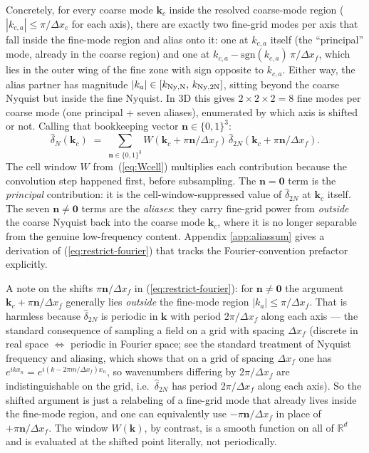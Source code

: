 \documentclass[12pt]{article}
\begin{document}
Concretely, for every coarse mode $\mathbf k_c$ inside the resolved
coarse-mode region ($|k_{c,a}|\le\pi/\Delta x_c$ for each axis), there
are exactly two fine-grid modes per axis that fall inside the fine-mode
region and alias onto it: one at $k_{c,a}$ itself (the ``principal''
mode, already in the coarse region) and one at
$k_{c,a}-\mathrm{sgn}(k_{c,a})\,\pi/\Delta x_f$, which lies in the
outer wing of the fine zone with sign opposite to $k_{c,a}$. Either way, the alias partner has magnitude
$|k_a|\in[k_{\rm Ny,N},\,k_{\rm Ny,2N}]$, sitting beyond the coarse
Nyquist but inside the fine Nyquist. In 3D this gives $2\times 2\times 2 = 8$
fine modes per coarse mode (one principal + seven aliases),
enumerated by which axis is shifted or not.
Calling that bookkeeping vector $\mathbf n\in\{0,1\}^3$:
\begin{equation}\label{eq:restrict-fourier}
  \hat\delta_N(\mathbf k_c)
  \;=\; \sum_{\mathbf n\in\{0,1\}^3}
        W(\mathbf k_c + \pi\mathbf n/\Delta x_f)\,
        \hat\delta_{2N}(\mathbf k_c + \pi\mathbf n/\Delta x_f).
\end{equation}
The cell window $W$ from~(\ref{eq:Wcell}) multiplies each contribution
because the convolution step happened first, before subsampling. The
$\mathbf n=\mathbf 0$ term is the \emph{principal} contribution: it is
the cell-window-suppressed value of $\hat\delta_{2N}$ at $\mathbf k_c$
itself. The seven $\mathbf n\ne\mathbf 0$ terms are the
\emph{aliases}: they carry fine-grid power from \emph{outside} the
coarse Nyquist back into the coarse mode $\mathbf k_c$, where it is no
longer separable from the genuine low-frequency content. Appendix
\ref{app:aliassum} gives a derivation of (\ref{eq:restrict-fourier})
that tracks the Fourier-convention prefactor explicitly.

A note on the shifts $\pi\mathbf n/\Delta x_f$ in
(\ref{eq:restrict-fourier}): for $\mathbf n\ne\mathbf 0$ the argument
$\mathbf k_c+\pi\mathbf n/\Delta x_f$ generally lies \emph{outside}
the fine-mode region $|k_a|\le\pi/\Delta x_f$. That is harmless
because $\hat\delta_{2N}$ is periodic in $\mathbf k$ with period
$2\pi/\Delta x_f$ along each axis --- the standard consequence of
sampling a field on a grid with spacing $\Delta x_f$ (discrete in
real space $\Leftrightarrow$ periodic in Fourier space; see
the standard treatment of Nyquist frequency and aliasing, which
shows that on a grid of spacing $\Delta x_f$ one has
$e^{ik x_n}=e^{i(k-2\pi m/\Delta x_f)x_n}$, so wavenumbers differing
by $2\pi/\Delta x_f$ are indistinguishable on the grid, i.e.\
$\hat\delta_{2N}$ has period $2\pi/\Delta x_f$ along each axis). So the shifted argument is just a relabeling
of a fine-grid mode that already lives inside the fine-mode region,
and one can equivalently use $-\pi\mathbf n/\Delta x_f$ in place of
$+\pi\mathbf n/\Delta x_f$. The window $W(\mathbf k)$, by contrast,
is a smooth function on all of $\mathbb R^d$ and is evaluated at the
shifted point literally, not periodically.
\end{document}
